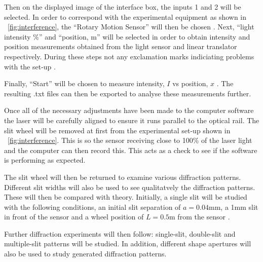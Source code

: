 \documentclass{article}
\newcommand{\figref}[2][\figurename~]{#1\ref{#2}}
\begin{document}
\vspace{2mm}
\noindent
Then on the displayed image of the interface box, the inputs 1 and 2 will be selected. In order to correspond with the experimental equipment as shown in \figref{fig:interference}, the ``Rotary Motion Sensor'' will then be chosen \cite{Paper02}. Next, ``light intensity \%'' and ``position, m'' \cite{Paper02} will be selected in order to obtain intensity and position measurements obtained from the light sensor and linear translator respectively. During these steps not any exclamation marks indiciating problems with the set-up \cite{Paper02}.

\vspace{2mm}
\noindent
Finally, ``Start'' will be chosen to measure intensity, $I$ vs position, $x$ \cite{Paper02}. The resulting .txt files can then be exported to analyse these measurements further. 

\vspace{2mm}
\noindent
Once all of the necessary adjustments have been made to the computer software the laser will be carefully aligned to ensure it runs parallel to the optical rail. The slit wheel will be removed at first from the experimental set-up shown in \figref{fig:interference}. This is so the sensor receiving close to 100\% of the laser light \cite{Paper02} and the computer can then record this. This acts as a check to see if the software is performing as expected.

\vspace{2mm}
\noindent
The slit wheel will then be returned to examine various diffraction patterns. Different slit widths will also be used to see qualitatvely \cite{Paper02} the diffraction patterns. These will then be compared with theory. Initially, a single slit will be studied with the following conditions, an initial slit separation of $a = 0.04$mm, a 1mm slit in front of the sensor and a wheel position of $L = 0.5$m from the sensor \cite{Paper02}. 

\vspace{2mm}
\noindent
Further diffraction experiments will then follow: single-slit, double-slit and multiple-slit patterns will be studied. In addition, different shape apertures will also be used to study generated diffraction patterns.   


\end{document}
